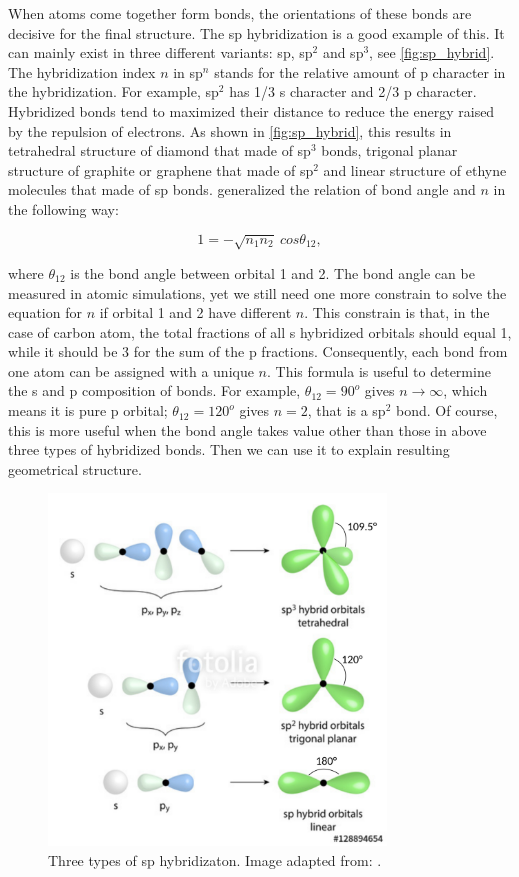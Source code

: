When atoms come together form bonds, the orientations of these bonds are decisive for the final structure. The sp hybridization is a good example of this.  It can mainly exist in three different variants: sp, sp$^2$ and sp$^3$, see \autoref{fig:sp_hybrid}. The hybridization index $n$ in sp$^n$ stands for the relative amount of p character in the hybridization. For example, sp$^2$ has 1/3 s character and 2/3 p character. Hybridized bonds  tend to maximized their distance to reduce the energy raised by the repulsion of electrons. As shown in \autoref{fig:sp_hybrid}, this results in tetrahedral structure of diamond that made of sp$^3$ bonds, trigonal planar structure of graphite or graphene that made of sp$^2$ and linear structure of ethyne molecules that made of sp bonds.  \citet{coulson1949} generalized the relation of bond angle and $n$ in the following way:

\begin{equation}
1=-\sqrt{n_1n_2}~cos\theta_{12}, 
\end{equation}

where $\theta_{12}$ is the bond angle between orbital 1 and 2. The bond angle can be measured in atomic simulations, yet we still need one more constrain to solve the equation for $n$ if orbital 1 and 2 have different $n$. This constrain is that, in the case of carbon atom, the total fractions of all s hybridized orbitals should equal 1, while it should be 3 for the sum of the p fractions. Consequently, each bond from one atom can be assigned with a unique $n$. This formula is useful to determine the s and p composition of bonds. For example, $\theta_{12}=90^o$ gives $n\rightarrow\infty$, which means it is pure p orbital; $\theta_{12}=120^o$ gives $n=2$, that is a sp$^2$ bond. Of course, this is more useful when the bond angle takes value other than those in above three types of hybridized bonds. Then we can use it to explain resulting geometrical structure.

\begin{figure}[htbp!] 
\centering  
\includegraphics[width=0.8\textwidth]{sp_hybrid.png}
\caption{Three types of sp hybridizaton. Image adapted from: \cite{sp_hybrid}. }  
\label{fig:sp_hybrid}
\end{figure} 


